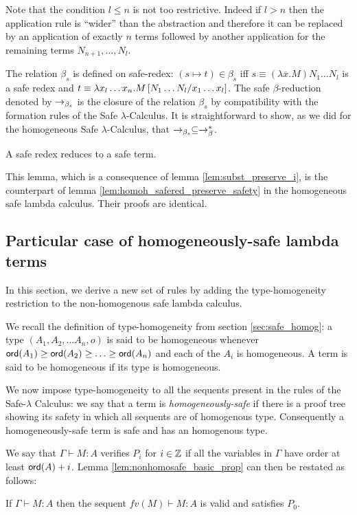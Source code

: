 Note that the condition $l\leq n$ is not too restrictive. Indeed if
$l>n$ then the application rule is ``wider'' than the abstraction
and therefore it can be replaced by an application of exactly $n$
terms followed by another application for the remaining terms
$N_{n+1}, \ldots, N_l$.


The relation $\beta_s$ is defined on safe-redex: $(s\mapsto t) \in
\beta_s$ iff $s \equiv (\lambda \overline{x} . M) N_1 \ldots N_l$ is
a safe redex and $t \equiv \lambda x_l \ldots x_n . M \left[ N_1
\ldots N_l/x_1 \ldots x_l \right]$. The safe $\beta$-reduction denoted by
$\rightarrow_{\beta_s}$ is the closure of the relation $\beta_s$ by
compatibility with the formation rules of the Safe
$\lambda$-Calculus. It is straightforward to show, as we did for the
homogeneous Safe $\lambda$-Calculus, that $\rightarrow_{\beta_s} \subseteq
\rightarrow_\beta^*$.


\begin{lem}
\label{lem:safereduction} A safe redex reduces to a safe term.
\end{lem}

This lemma, which is a consequence of lemma
\ref{lem:subst_preserve_i}, is the counterpart of lemma
\ref{lem:homoh_safered_preserve_safety} in the homogeneous safe
lambda calculus. Their proofs are identical.


\subsection{Particular case of homogeneously-safe lambda terms}

In this section, we derive a new set of rules by adding the type-homogeneity restriction to the non-homogenous safe lambda calculus.

We recall the definition of type-homogeneity from section
\ref{sec:safe_homog}: a type $(A_1, A_2, \ldots A_n, o)$ is said to
be homogeneous whenever ${\sf ord}(A_1) \geq {\sf ord}(A_2) \geq \ldots \geq
{\sf ord}(A_n)$ and each of the $A_i$ is homogeneous. A term is said to
be homogeneous if its type is homogeneous.

We now impose type-homogeneity to all the sequents present in the rules of the Safe-$\lambda$ Calculus:
we say that a term is \emph{homogeneously-safe} if there is a proof tree showing its safety in which all sequents
are of homogenous type. Consequently a homogeneously-safe term is safe and has an homogenous type.

We say that $\Gamma \vdash M : A$ verifies $P_i$ for $i \in \mathbb{Z}$
if all the variables in $\Gamma$ have order at least ${\sf ord}(A)+i$.
Lemma \ref{lem:nonhomosafe_basic_prop} can then be restated as
follows:
\begin{lem}
\label{lem:context_reduction} If $\Gamma \vdash M : A$ then the sequent $fv(M) \vdash M : A$ is valid and satisfies $P_0$.
\end{lem}


